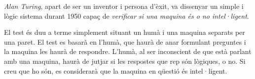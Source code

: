 \emph{Alan Turing}, apart de ser un inventor i persona d'èxit, va dissenyar un simple i lògic sistema durant 1950 capaç de \emph{verificar si una maquina és o no intel·ligent}.

El test és duu a terme simplement situant un humà i una maquina separats per una paret. El test es basarà en l'humà, que haurà de anar formulant preguntes i la maquina les haurà de respondre. L'humà, al ser inconscient de que està parlant amb una maquina, haurà de jutjar si les respostes que rep són lògiques, o no. Si creu que ho són, es considerarà que la maquina en qüestió és intel·ligent. \cite{TurTest} 
